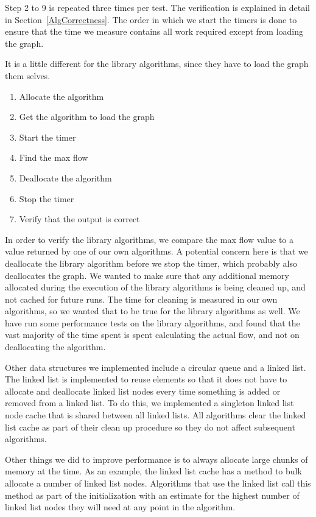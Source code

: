 Step 2 to 9 is repeated three times per test.
The verification is explained in detail in Section~\ref{AlgCorrectness}.
The order in which we start the timers is done to ensure that the time we measure contains all work required except from loading the graph.

It is a little different for the library algorithms, since they have to load the graph them selves.
\begin{enumerate}
  \item Allocate the algorithm
  \item Get the algorithm to load the graph
  \item Start the timer
  \item Find the max flow
  \item Deallocate the algorithm
  \item Stop the timer
  \item Verify that the output is correct
\end{enumerate}
In order to verify the library algorithms, we compare the max flow value to a value returned by one of our own algorithms.
A potential concern here is that we deallocate the library algorithm before we stop the timer, which probably also deallocates the graph.
We wanted to make sure that any additional memory allocated during the execution of the library algorithms is being cleaned up, and not cached for future runs.
The time for cleaning is measured in our own algorithms, so we wanted that to be true for the library algorithms as well.
We have run some performance tests on the library algorithms, and found that the vast majority of the time spent is spent calculating the actual flow, and not on deallocating the algorithm.

Other data structures we implemented include a circular queue and a linked list.
The linked list is implemented to reuse elements so that it does not have to allocate and deallocate linked list nodes every time something is added or removed from a linked list.
To do this, we implemented a singleton linked list node cache that is shared between all linked lists.
All algorithms clear the linked list cache as part of their clean up procedure so they do not affect subsequent algorithms.

Other things we did to improve performance is to always allocate large chunks of memory at the time. 
As an example, the linked list cache has a method to bulk allocate a number of linked list nodes.
Algorithms that use the linked list call this method as part of the initialization with an estimate for the highest number of linked list nodes they will need at any point in the algorithm.

